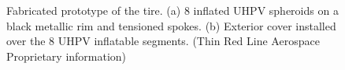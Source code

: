 \documentclass{article}
\begin{document}
\begin{figure}[hbt!]
    \centering
    \begin{minipage}{0.35\textwidth}
        \centering
    \end{minipage}
    \begin{minipage}{0.6\textwidth}
        \centering
    \end{minipage}
    \caption{Fabricated prototype of the tire. (a) 8 inflated UHPV spheroids on a black metallic rim and tensioned spokes. (b) Exterior cover installed over the 8 UHPV inflatable segments. (Thin Red Line Aerospace Proprietary information)}
    \label{tire_prototype}
\end{figure}
\end{document}
